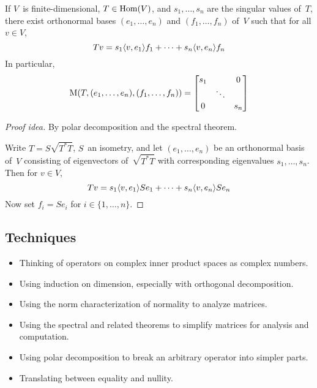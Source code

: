 \begin{thm}
If \(V\)~is finite-dimensional, \(T\in\operatorname{Hom}(V)\), and \(s_1,\ldots,s_n\) are the singular values of~\(T\), there exist orthonormal bases \((e_1,\ldots,e_n)\) and \((f_1,\ldots,f_n)\) of~\(V\) such that for all \(v\in V\),
\[Tv=s_1\langle{v},{e_1}\rangle f_1+\cdots+s_n\langle{v},{e_n}\rangle f_n\]
In particular,
\[\operatorname{M}(T,(e_1,\ldots,e_n),(f_1,\ldots,f_n))=\left[\begin{matrix}
s_1&&0\\
&\ddots&\\
0&&s_n
\end{matrix}\right]\]
\end{thm}
\begin{proof}[Proof idea]
By polar decomposition and the spectral theorem.

Write \(T=S\sqrt{T^*T}\), \(S\)~an isometry, and let \((e_1,\ldots,e_n)\) be an orthonormal basis of~\(V\) consisting of eigenvectors of~\(\sqrt{T^*T}\) with corresponding eigenvalues \(s_1,\ldots,s_n\). Then for \(v\in V\),
\[Tv=s_1\langle{v},{e_1}\rangle Se_1+\cdots+s_n\langle{v},{e_n}\rangle Se_n\]
Now set \(f_i=Se_i\) for \(i\in\{1,\ldots,n\}\).
\end{proof}

\subsection*{Techniques}
\begin{itemize}[itemsep=0pt]
\item Thinking of operators on complex inner product spaces as complex numbers.
\item Using induction on dimension, especially with orthogonal decomposition.
\item Using the norm characterization of normality to analyze matrices.
\item Using the spectral and related theorems to simplify matrices for analysis and computation.
\item Using polar decomposition to break an arbitrary operator into simpler parts.
\item Translating between equality and nullity.
\end{itemize}
